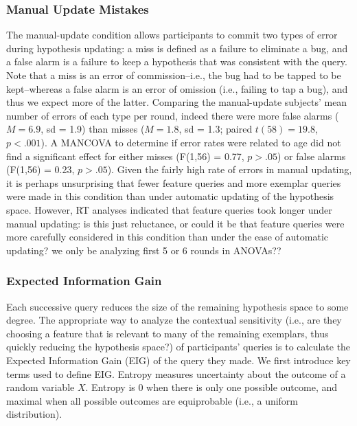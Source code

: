 \documentclass[10pt,letterpaper]{article}
\begin{document}
\subsubsection{Manual Update Mistakes}

The manual-update condition allows participants to commit two types of error during 
hypothesis updating: a miss is defined as a failure to eliminate a bug, and a false 
alarm is a failure to keep a hypothesis that was consistent with the query. Note that 
a miss is an error of commission--i.e., the bug had to be tapped to be kept--whereas 
a false alarm is an error of omission (i.e., failing to tap a bug), and thus we expect 
more of the latter. Comparing the manual-update subjects' mean number of errors of 
each type per round, indeed there were more false alarms ($M=6.9$, sd = 1.9) than 
misses ($M=1.8$, sd = 1.3; paired $t(58) = 19.8$, $p<.001$). A MANCOVA to 
determine if error rates were related to age did not find a significant effect for either 
misses (F(1,56) = 0.77, $p>.05$) or false alarms (F(1,56) = 0.23, $p>.05$). Given 
the fairly high rate of errors in manual updating, it is perhaps unsurprising that fewer 
feature queries and more exemplar queries were made in this condition than under 
automatic updating of the hypothesis space. However, RT analyses indicated that 
feature queries took longer under manual updating: is this just reluctance, or could it 
be that feature queries were more carefully considered in this condition than under 
the ease of automatic updating? 
we only be analyzing first 5 or 6 rounds in ANOVAs??

\subsubsection{Expected Information Gain}

Each successive query reduces the size of the remaining hypothesis space to some 
degree. The appropriate way to analyze the contextual sensitivity (i.e., are they 
choosing a feature that is relevant to many of the remaining exemplars, thus quickly 
reducing the hypothesis space?) of participants' queries is to calculate the Expected 
Information Gain (EIG) of the query they made. We first introduce key terms used to 
define EIG. Entropy measures uncertainty about the outcome of a random variable 
$X$. Entropy is 0 when there is only one possible outcome, and maximal when all 
possible outcomes are equiprobable (i.e., a uniform distribution).
\end{document}
